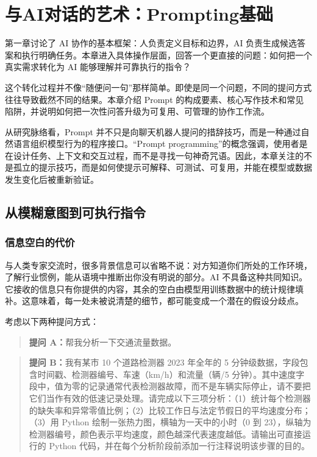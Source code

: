 ﻿\chapter{与AI对话的艺术：Prompting基础}

第一章讨论了 AI 协作的基本框架：人负责定义目标和边界，AI 负责生成候选答案和执行明确任务。本章进入具体操作层面，回答一个更直接的问题：如何把一个真实需求转化为 AI 能够理解并可靠执行的指令？

这个转化过程并不像“随便问一句”那样简单。即使是同一个问题，不同的提问方式往往导致截然不同的结果。本章介绍 Prompt 的构成要素、核心写作技术和常见陷阱，并说明如何把一次性问答升级为可复用、可管理的协作工作流。

从研究脉络看，Prompt 并不只是向聊天机器人提问的措辞技巧，而是一种通过自然语言组织模型行为的程序接口。“Prompt programming”的概念强调，使用者是在设计任务、上下文和交互过程，而不是寻找一句神奇咒语\cite{reynolds2021prompt}。因此，本章关注的不是孤立的提示技巧，而是如何使提示可解释、可测试、可复用，并能在模型或数据发生变化后被重新验证。

\section{从模糊意图到可执行指令}

\subsection{信息空白的代价}

与人类专家交流时，很多背景信息可以省略不说：对方知道你们所处的工作环境，了解行业惯例，能从语境中推断出你没有明说的部分。AI 不具备这种共同知识。它接收的信息只有你提供的内容，其余的空白由模型用训练数据中的统计规律填补。这意味着，每一处未被说清楚的细节，都可能变成一个潜在的假设分歧点。

考虑以下两种提问方式：

\begin{quote}
\textbf{提问 A：}帮我分析一下交通流量数据。
\end{quote}

\begin{quote}
\textbf{提问 B：}我有某市 10 个道路检测器 2023 年全年的 5 分钟级数据，字段包含时间戳、检测器编号、车速（km/h）和流量（辆/5 分钟）。其中速度字段中，值为零的记录通常代表检测器故障，而不是车辆实际停止，请不要把它们当作有效的低速记录处理。请完成以下三项分析：（1）统计每个检测器的缺失率和异常零值比例；（2）比较工作日与法定节假日的平均速度分布；（3）用 Python 绘制一张热力图，横轴为一天中的小时（0 到 23），纵轴为检测器编号，颜色表示平均速度，颜色越深代表速度越低。请输出可直接运行的 Python 代码，并在每个分析阶段前添加一行注释说明该步骤的目的。
\end{quote}

